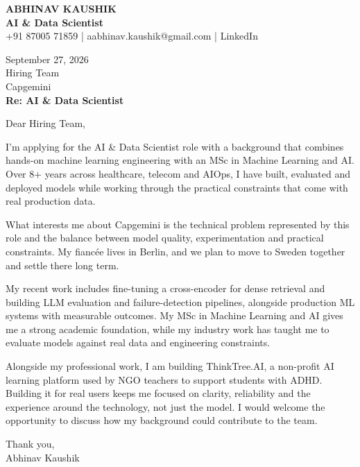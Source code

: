 \documentclass[10pt,a4paper]{article}
\begin{document}
\begin{center}
{\Large\bfseries ABHINAV KAUSHIK}\\[2pt]
{\bfseries AI \& Data Scientist}\\[2pt]
+91 87005 71859 \quad | \quad aabhinav.kaushik@gmail.com \quad | \quad LinkedIn
\end{center}
\vspace{8pt}
September 27, 2026\\[6pt]
Hiring Team\\
Capgemini\\[4pt]
\textbf{Re: AI \& Data Scientist}

Dear Hiring Team,

I’m applying for the AI \& Data Scientist role with a background that combines hands-on machine learning engineering with an MSc in Machine Learning and AI. Over 8+ years across healthcare, telecom and AIOps, I have built, evaluated and deployed models while working through the practical constraints that come with real production data.

What interests me about Capgemini is the technical problem represented by this role and the balance between model quality, experimentation and practical constraints. My fiancée lives in Berlin, and we plan to move to Sweden together and settle there long term.

My recent work includes fine-tuning a cross-encoder for dense retrieval and building LLM evaluation and failure-detection pipelines, alongside production ML systems with measurable outcomes. My MSc in Machine Learning and AI gives me a strong academic foundation, while my industry work has taught me to evaluate models against real data and engineering constraints.

Alongside my professional work, I am building ThinkTree.AI, a non-profit AI learning platform used by NGO teachers to support students with ADHD. Building it for real users keeps me focused on clarity, reliability and the experience around the technology, not just the model. I would welcome the opportunity to discuss how my background could contribute to the team.

Thank you,\\
Abhinav Kaushik
\end{document}

